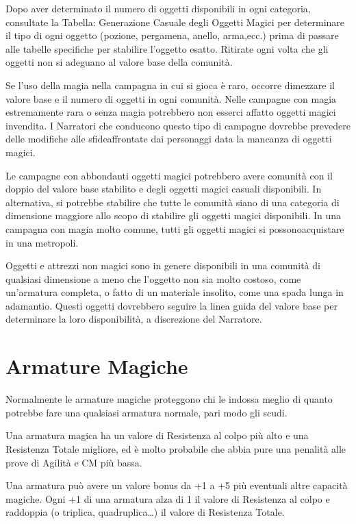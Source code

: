 \documentclass[a4paper,11pt,twoside,openany]{book}
\begin{document}
Dopo aver determinato il numero di oggetti disponibili in ogni categoria, consultate la Tabella: Generazione Casuale degli Oggetti Magici per determinare il tipo di ogni oggetto (pozione, pergamena, anello, arma,ecc.) prima di passare alle tabelle specifiche per stabilire l'oggetto esatto. Ritirate ogni volta che gli oggetti non si adeguano al valore base della comunità.

Se l'uso della magia nella campagna in cui si gioca è raro, occorre dimezzare il valore base e il numero di oggetti in ogni comunità. Nelle campagne con magia estremamente rara o senza magia potrebbero non esserci affatto oggetti magici invendita. I Narratori che conducono questo tipo di campagne dovrebbe prevedere delle modifiche alle sfideaffrontate dai personaggi data la mancanza di oggetti magici.

Le campagne con abbondanti oggetti magici potrebbero avere comunità con il doppio del valore base stabilito e degli oggetti magici casuali disponibili. In alternativa, si potrebbe stabilire che tutte le comunità siano di una categoria di dimensione maggiore allo scopo di stabilire gli oggetti magici disponibili. In una campagna con magia molto comune, tutti gli oggetti magici si possonoacquistare in una metropoli.

Oggetti e attrezzi non magici sono in genere disponibili in una comunità di qualsiasi dimensione a meno che l'oggetto non sia molto costoso, come un'armatura completa, o fatto di un materiale insolito, come una spada lunga in adamantio. Questi oggetti dovrebbero seguire la linea guida del valore base per determinare la loro disponibilità, a discrezione del Narratore.

\pagebreak

\section{Armature Magiche}

\label{armature-magiche}

Normalmente le armature magiche proteggono chi le indossa meglio di quanto potrebbe fare una qualsiasi armatura normale, pari modo gli scudi.

Una armatura magica ha un valore di Resistenza al colpo più alto e una Resistenza Totale migliore, ed è molto probabile che abbia pure una penalità alle prove di Agilità e CM più bassa.

Una armatura può avere un valore bonus da +1 a +5 più eventuali altre capacità magiche. Ogni +1 di una armatura alza di 1 il valore di Resistenza al colpo e raddoppia (o triplica, quadruplica\ldots ) il valore di Resistenza Totale.
\end{document}
